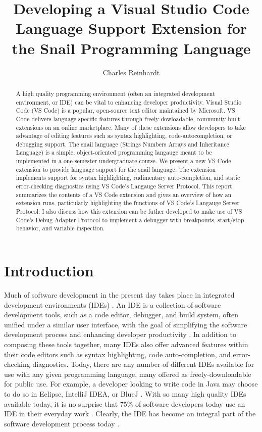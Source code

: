 \documentclass{article}
\title{Developing a Visual Studio Code Language Support Extension for the Snail Programming Language}
\author{Charles Reinhardt}
\begin{document}
\maketitle

\begin{abstract}

    A high quality programming environment (often an integrated development environment, or IDE) can be vital to enhancing developer productivity. Visual Studio Code (VS Code) is a popular, open-source text editor maintained by Microsoft. VS Code delivers language-specific features through freely dowloadable, community-built extensions on an online marketplace. Many of these extensions allow developers to take advantage of editing features such as syntax highlighting, code-autocompletion, or debugging support. The snail language (Strings Numbers Arrays and Inheritance Language) is a simple, object-oriented programming langauge meant to be implemented in a one-semester undergraduate course. We present a new VS Code extension to provide language support for the snail language. The extension implements support for syntax highlighting, rudimentary auto-completion, and static error-checking diagnostics using VS Code's Langauge Server Protocol. This report summarizes the contents of a VS Code extension and gives an overview of how an extension runs, particularly highlighting the functions of VS Code's Langauge Server Protocol. I also discuss how this extension can be futher developed to make use of VS Code's Debug Adapter Protocol to implement a debugger with breakpoints, start/stop behavior, and variable inspection.

\end{abstract}

\section{Introduction}

Much of software development in the present day takes place in integrated development environments (IDEs) \cite{JetBrains_2019}. An IDE is a collection of software development tools, such as a code editor, debugger, and build system, often unified under a similar user interface, with the goal of simplifying the software development process and enhancing developer productivity \cite{Gillis_Silverthorne_2018,Shyniaieva_2023}. In addition to composing these tools together, many IDEs also offer advanced features within their code editors such as syntax highlighting, code auto-completion, and error-checking diagnostics. Today, there are any number of different IDEs available for use with any given programming language, many offered as freely-downloadable for public use. For example, a developer looking to write code in Java may choose to do so in Eclipse, IntelliJ IDEA, or BlueJ \cite{EclipseFoundation_2023, JetBrains_2023,KingsProgrammingEducationToolsGroup_2022}. With so many high quality IDEs available today, it is no surprise that 75\% of software developers today use an IDE in their everyday work \cite{JetBrains_2019}. Clearly, the IDE has become an integral part of the software development process today \cite{Vaniukov_2023}. 
\end{document}
